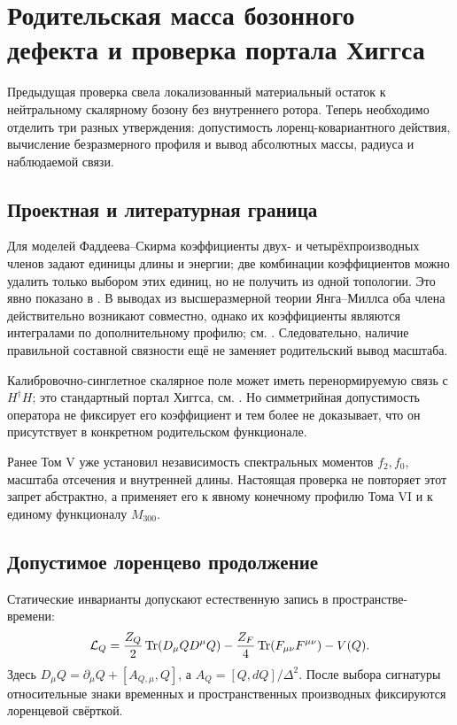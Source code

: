 \chapter{Родительская масса бозонного дефекта и проверка портала Хиггса}

Предыдущая проверка свела локализованный материальный остаток к нейтральному
скалярному бозону без внутреннего ротора. Теперь необходимо отделить три
разных утверждения: допустимость лоренц-ковариантного действия, вычисление
безразмерного профиля и вывод абсолютных массы, радиуса и наблюдаемой связи.

\section{Проектная и литературная граница}

Для моделей Фаддеева--Скирма коэффициенты двух- и четырёхпроизводных членов
задают единицы длины и энергии; две комбинации коэффициентов можно удалить
только выбором этих единиц, но не получить из одной топологии. Это явно
показано в . В выводах из высшеразмерной теории
Янга--Миллса оба члена действительно возникают совместно, однако их
коэффициенты являются интегралами по дополнительному профилю; см.
. Следовательно, наличие правильной составной
связности ещё не заменяет родительский вывод масштаба.

Калибровочно-синглетное скалярное поле может иметь перенормируемую связь с
$H^\dagger H$; это стандартный портал Хиггса, см.
. Но симметрийная допустимость оператора не
фиксирует его коэффициент и тем более не доказывает, что он присутствует в
конкретном родительском функционале.

Ранее Том V уже установил независимость спектральных моментов $f_2,f_0$,
масштаба отсечения и внутренней длины. Настоящая проверка не повторяет этот
запрет абстрактно, а применяет его к явному конечному профилю Тома VI и к
единому функционалу $M_{300}$.

\section{Допустимое лоренцево продолжение}

Статические инварианты допускают естественную запись в пространстве-времени:
\begin{equation}
 \mathcal L_Q=
 \frac{Z_Q}{2}\operatorname{Tr}(D_\mu QD^\mu Q)
 -\frac{Z_F}{4}\operatorname{Tr}(F_{\mu\nu}F^{\mu\nu})
 -V(Q).
 \label{eq:v6-bosonic-lorentz-admissible-action}
\end{equation}
Здесь $D_\mu Q=\partial_\mu Q+[A_{Q,\mu},Q]$, а
$A_Q=[Q,dQ]/\Delta^2$. После выбора сигнатуры относительные знаки временных
и пространственных производных фиксируются лоренцевой свёрткой.

